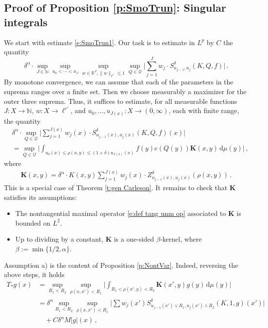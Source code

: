 \documentclass[12pt,reqno,a4paper,dvipsnames]{amsart}
\theoremstyle{plain}
\theoremstyle{definition}
\numberwithin{theorem}{section}
\numberwithin{equation}{section}
\newcommand{\R}{\mathbb{R}}
\begin{document}
    \subsection{Proof of Proposition \ref{p:SmoTrun}: Singular integrals} 
    We start with estimate \eqref{e:SmoTrun1}.
    Our task is to estimate in $L^p$ by $C$ the quantity
    \[
         \delta^{\alpha} \cdot \sup_{J \in \mathbb{N}} \sup_{u_0 < \dotsb < u_J} \sup_{w \in \R^J, \|w\|_{\ell^{r'}} \le 1} \sup_{Q \in \mathcal{Q}} \Big| \sum_{j=1}^J w_j \cdot S^\delta_{u_{j-1}, u_j}(K, Q, f) \Big|\,.
    \]
    By monotone convergence, we can assume that each of the parameters in the suprema ranges over a finite set. Then we choose measurably a maximizer for the outer three suprema. Thus, it suffices to estimate, for all measurable functions $J: X \to \mathbb{N}$, $w: X \to \ell^{r'}$, and $u_0, \dotsc, u_{J(x)}: X \to (0,\infty)$, each with finite range, the quantity
    \begin{align}
        &\delta^{\alpha} \cdot \sup_{Q \in \mathcal{Q}} \Big| \sum_{j=1}^{J(x)} w_j(x) \cdot S^\delta_{u_{j-1}(x), u_j(x)}(K, Q, f)(x)\Big|\nonumber\\
        &= \sup_{Q \in \mathcal{Q}} \Big| \int_{u_0(x) \le \rho(x,y) \le (1+\delta)u_{J(x)}(x)} f(y) e(Q(y)) \mathbf{K}(x,y) \, \mathrm{d}\mu(y) \Big|\,, \label{e:lin_op}
    \end{align}
    where
    \begin{align*}
        \mathbf{K}(x,y) = \delta^{\alpha} \cdot K(x,y) \sum_{j=1}^{J(x)} w_j(x) \cdot Z_{u_{j-1}(x), u_j(x)}^{\delta}(\rho(x,y)) \, .
    \end{align*}
    This is a special case of Theorem \ref{t:gen Carleson}. It remains to check that $\mathbf{K}$ satisfies its assumptions:
    \begin{itemize}
        \item[a)] The nontangential maximal operator \eqref{e:def tang unm op} associated to $\mathbf{K}$ is bounded on $L^2$.
        \item[b)] Up to dividing by a constant, $\mathbf{K}$ is a one-sided $\beta$-kernel, where $\beta := \min\{1/2, \alpha\}$.
    \end{itemize}  
    Assumption a) is the content of Proposition \ref{p:NontVar}. Indeed, reversing the above steps, it holds
    \begin{align}
        T_* g(x) &= \sup_{R_1 < R_2} \sup_{\rho(x,x') < R_1} \Big| \int_{R_1 < \rho(x', y) < R_2} \mathbf{K}(x',y) g(y) \, \mathrm{d}\mu(y) \Big|\label{e:details}\\
        &= \delta^\alpha \sup_{R_1 < R_2} \sup_{\rho(x,x') < R_1} \Big| \sum w_j(x') S_{u_{j-1}(x') \vee R_1, u_j(x') \wedge R_2}^\delta (K, 1, g)(x') \Big|\nonumber\\
        &\quad + C\delta^\alpha M |g|(x)\,,\label{e:details2}
    \end{align}
\end{document}
